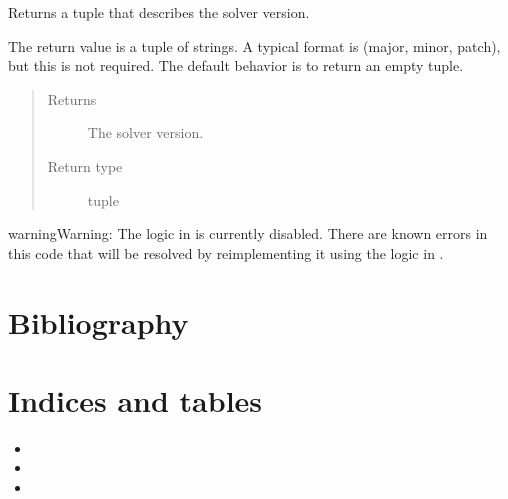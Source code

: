 \documentclass[letterpaper,10pt,english]{sphinxmanual}
\begin{document}
\begin{fulllineitems}
\begin{fulllineitems}
\label{\detokenize{reference/mpr:pao.mpr.solvers.reg.LinearMultilevelSolver_REG.version}}
Returns a tuple that describes the solver version.

The return value is a tuple of strings.  A typical format is (major, minor, patch), but this
is not required. The default behavior is to return an empty tuple.
\begin{quote}\begin{description}
\item[{Returns}] \leavevmode
The solver version.

\item[{Return type}] \leavevmode
tuple

\end{description}\end{quote}

\end{fulllineitems}


\end{fulllineitems}


\begin{sphinxadmonition}{warning}{Warning:}
The logic in  is currently disabled.  There are known errors in this code
that will be resolved by re\sphinxhyphen{}implementing it using the logic in .
\end{sphinxadmonition}



\section{Bibliography}
\label{\detokenize{bibliography:bibliography}}\label{\detokenize{bibliography::doc}}

\section{Indices and tables}
\label{\detokenize{index:indices-and-tables}}\begin{itemize}
\item {} 

\item {} 

\item {} 

\end{itemize}
\end{document}
